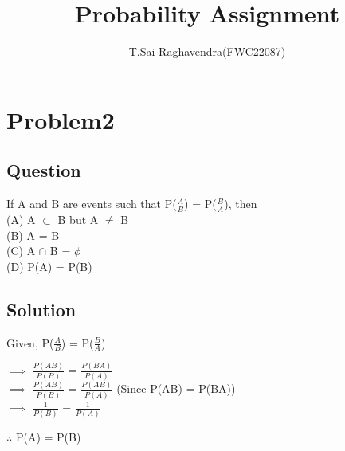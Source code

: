 \documentclass[journal,12pt,twocolumn]{IEEEtran}
\title{\mytitle}
\title{
Probability Assignment
}
\author{T.Sai Raghavendra(FWC22087)}
\begin{document}
\maketitle
\tableofcontents
\bigskip
\section{\textbf{Problem2}}	
\subsection{\textbf{Question}}
If A and B are events such that P($\frac{A}{B}$) = P($\frac{B}{A}$), then\\
(A) A $\subset$ B but A $\not=$ B \\(B) A = B\\
(C) A $\cap$ B = $\phi$ \\(D) P(A) = P(B)\\
\subsection{\textbf{Solution}}
Given, P($\frac{A}{B}$) = P($\frac{B}{A}$)
\begin{center}
$\implies$ $\frac{P(AB)}{P(B)}$ = $\frac{P(BA)}{P(A)}$\\ 
$\implies$ $\frac{P(AB)}{P(B)}$ = $\frac{P(AB)}{P(A)}$ (Since P(AB) = P(BA))\\
$\implies$ $\frac{1}{P(B)}$ = $\frac{1}{P(A)}$\\
\end{center}
\begin{center}
$\therefore$ P(A) = P(B)
\end{center}
\end{document}

